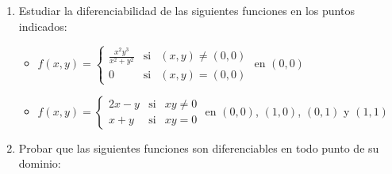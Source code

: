 \documentclass[11pt]{book}
\theoremstyle{definicion}
\theoremstyle{teorema}
\theoremstyle{ejemplo}
\begin{document}
\begin{enumerate}

\item Estudiar la diferenciabilidad de las siguientes funciones en los puntos
indicados:
\begin{itemize}
\item[a)] $f(x,y)=\left\{ 
\begin{array}{ccc}
\frac{x^{2}y^{3}}{x^{2}+y^{2}} & \text{si} & \left( x,y\right) \neq \left(
0,0\right)  \\ 
0 & \text{si} & \left( x,y\right) =\left( 0,0\right) 
\end{array}%
\right. $ en $\left( 0,0\right) $

\item[b)] $f(x,y)=\left\{ 
\begin{array}{ccc}
2x-y & \text{si} & xy\neq 0 \\ 
x+y & \text{si} & xy=0%
\end{array}%
\right. $ en $\left( 0,0\right) $, $\left( 1,0\right) $, $\left( 0,1\right) $
y $\left( 1,1\right) $







\end{itemize}

\item Probar que las siguientes funciones son diferenciables en todo punto de su dominio:
\end{enumerate}
\end{document}
